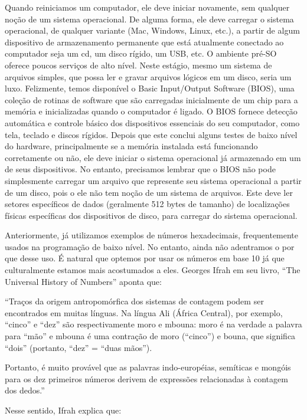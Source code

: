 Quando reiniciamos um computador, ele deve iniciar novamente, sem qualquer noção de um sistema operacional. De alguma forma, ele deve carregar o sistema operacional, de qualquer variante (Mac, Windows, Linux, etc.), a partir de algum dispositivo de armazenamento permanente que está atualmente conectado ao computador seja um cd, um disco rígido, um USB, etc. O ambiente pré-SO oferece poucos serviços de alto nível. Neste estágio, mesmo um sistema de arquivos simples, que possa ler e gravar arquivos lógicos em um disco, seria um luxo. Felizmente, temos disponível o Basic Input/Output Software (BIOS), uma coleção de rotinas de software que são carregadas inicialmente de um chip para a memória e inicializadas quando o computador é ligado. O BIOS fornece detecção automática e controle básico dos dispositivos essenciais do seu computador, como tela, teclado e discos rígidos. Depois que este conclui alguns testes de baixo nível do hardware, principalmente se a memória instalada está funcionando corretamente ou não, ele deve iniciar o sistema operacional já armazenado em um de seus dispositivos. No entanto, precisamos lembrar que o BIOS não pode simplesmente carregar um arquivo que represente seu sistema operacional a partir de um disco, pois o ele não tem noção de um sistema de arquivos. Este deve ler setores específicos de dados (geralmente 512 bytes de tamanho) de localizações físicas específicas dos dispositivos de disco, para carregar do sistema operacional.

Anteriormente, já utilizamos exemplos de números hexadecimais, frequentemente usados na programação de baixo nível. No entanto, ainda não adentramos o por que desse uso. É natural que optemos por usar os números em base 10 já que culturalmente estamos mais acostumados a eles. Georges Ifrah em seu livro, ``The Universal History of Numbers''\cite{14} aponta que:

``Traços da origem antropomórfica dos sistemas de contagem podem ser encontrados em muitas línguas. Na língua Ali (África Central), por exemplo, ``cinco'' e ``dez'' são respectivamente moro e mbouna: moro é na verdade a palavra para ``mão'' e mbouna é uma contração de moro (``cinco'') e bouna, que significa ``dois'' (portanto, ``dez'' = ``duas mãos'').

Portanto, é muito provável que as palavras indo-européias, semíticas e mongóis para os dez primeiros números derivem de expressões relacionadas à contagem dos dedos.''

Nesse sentido, Ifrah explica que:

